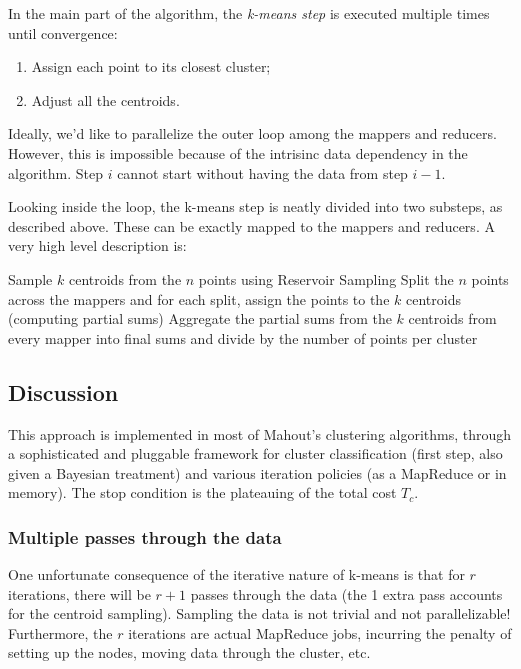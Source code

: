 \documentclass{article}
\begin{document}
In the main part of the algorithm, the \textit{k-means step} is executed
multiple times until convergence:
\begin{enumerate}
    \item Assign each point to its closest cluster;
    \item Adjust all the centroids.
\end{enumerate}

Ideally, we'd like to parallelize the outer loop among the mappers and
reducers. However, this is impossible because of the intrisinc data dependency
in the algorithm. Step $i$ cannot start without having the data from step $i -
1$.

Looking inside the loop, the k-means step is neatly divided into two
substeps, as described above. These can be exactly mapped to the mappers and
reducers. A very high level description is:
\\
\begin{algorithmic}[1]
    \State Sample $k$ centroids from the $n$ points using Reservoir Sampling
        \State Split the $n$ points across the mappers and for each split,
        assign the points to the $k$ centroids (computing partial sums)
        \State Aggregate the partial sums from the $k$ centroids from every
        mapper into final sums and divide by the number of points per cluster
    \EndWhile
\end{algorithmic}

\subsection{Discussion}
This approach is implemented in most of Mahout's clustering algorithms, through
a sophisticated and pluggable framework for cluster classification (first step,
also given a Bayesian treatment) and various iteration policies (as a MapReduce
or in memory). The stop condition is the plateauing of the total cost $T_c$.

\subsubsection{Multiple passes through the data}
One unfortunate consequence of the iterative nature of k-means is that for $r$
iterations, there will be $r + 1$ passes through the data (the 1 extra pass
accounts for the centroid sampling).
Sampling the data is not trivial and not parallelizable!
Furthermore, the $r$ iterations are actual MapReduce jobs, incurring the
penalty of setting up the nodes, moving data through the cluster, etc.
\end{document}
